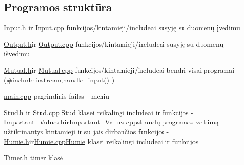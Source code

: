  \subsection*{Programos struktūra}


\begin{DoxyItemize}
\item {\ttfamily \mbox{\hyperlink{_input_8h}{Input.\+h}}} ir {\ttfamily \mbox{\hyperlink{_input_8cpp}{Input.\+cpp}}} funkcijos/kintamieji/include\textquotesingle{}ai susyję su duomenų įvedimu
\item {\ttfamily \mbox{\hyperlink{_output_8h}{Output.\+h}}}ir {\ttfamily \mbox{\hyperlink{_output_8cpp}{Output.\+cpp}}} funkcijos/kintamieji/include\textquotesingle{}ai susyję su duomenų išvedimu
\item {\ttfamily \mbox{\hyperlink{_mutual_8h}{Mutual.\+h}}}ir {\ttfamily \mbox{\hyperlink{_mutual_8cpp}{Mutual.\+cpp}}} funkcijos/kintamieji/include\textquotesingle{}ai bendri visai programai ({\ttfamily \#include iostream},{\ttfamily \mbox{\hyperlink{_mutual_8h_af5dbaf849b333f367635716ee55d1e3d}{handle\+\_\+input()}}} )
\item {\ttfamily \mbox{\hyperlink{main_8cpp}{main.\+cpp}}} pagrindinis failas -\/ meniu
\item {\ttfamily \mbox{\hyperlink{_stud_8h}{Stud.\+h}}} ir {\ttfamily \mbox{\hyperlink{_stud_8cpp}{Stud.\+cpp}}} \mbox{\hyperlink{class_stud}{Stud}} klasei reikalingi include{\ttfamily ai ir funkcijos -\/}{\ttfamily \mbox{\hyperlink{_important___values_8h}{Important\+\_\+\+Values.\+h}}}{\ttfamily ir}{\ttfamily \mbox{\hyperlink{_important___values_8cpp}{Important\+\_\+\+Values.\+cpp}}}{\ttfamily sklandų programos veikimą užtikrinantys kintamieji ir su jais dirbančios funkcijos -\/}{\ttfamily \mbox{\hyperlink{_humie_8h}{Humie.\+h}}}{\ttfamily ir}{\ttfamily \mbox{\hyperlink{_humie_8cpp}{Humie.\+cpp}}}{\ttfamily \mbox{\hyperlink{class_humie}{Humie}} klasei reikalingi include}ai ir funkcijos
\item {\ttfamily \mbox{\hyperlink{_timer_8h}{Timer.\+h}}} timer klasė 
\end{DoxyItemize}